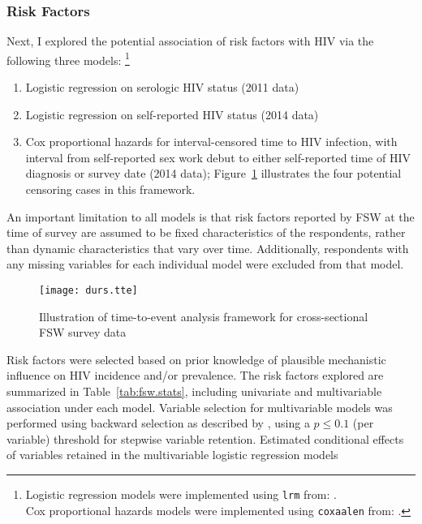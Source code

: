 \subsubsection{Risk Factors}\label{model.par.fsw.fac}
Next, I explored the potential association of risk factors with HIV
via the following three models:%
\footnote{Logistic regression models were implemented using \texttt{lrm} from:
  .\\
Cox proportional hazards models were implemented using \texttt{coxaalen} from:
  .}
\begin{enumerate}
  \item Logistic regression on serologic HIV status (2011 data)
  \item Logistic regression on self-reported HIV status (2014 data)
  \item Cox proportional hazards for interval-censored time to HIV infection,
    with interval from self-reported sex work debut 
    to either self-reported time of HIV diagnosis or survey date (2014 data);
    Figure~\ref{fig:fsw.tte.interval} illustrates
    the four potential censoring cases in this framework.
\end{enumerate}
An important limitation to all models is that
risk factors reported by FSW at the time of survey
are assumed to be fixed characteristics of the respondents,
rather than dynamic characteristics that vary over time.
Additionally, respondents with any missing variables for each individual model
were excluded from that model. %
\begin{figure}
  \centering
  \texttt{[image: durs.tte]}
  \caption{Illustration of time-to-event analysis framework
    for cross-sectional FSW survey data}
  \label{fig:fsw.tte.interval}
\end{figure}
\par
Risk factors were selected based on
prior knowledge of plausible mechanistic influence on HIV incidence and/or prevalence.
The risk factors explored are summarized in Table~\ref{tab:fsw.stats},
including univariate and multivariable association under each model.
Variable selection for multivariable models
was performed using backward selection as described by \citet{Lawless1978},
using a $p \le 0.1$ (per variable) threshold for stepwise variable retention.
Estimated conditional effects of
variables retained in the multivariable logistic regression models
